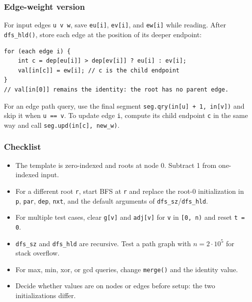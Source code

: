 \subsubsection{Edge-weight version}
For input edges \texttt{u v w}, save \texttt{eu[i]}, \texttt{ev[i]}, and \texttt{ew[i]} while reading. After \texttt{dfs\_hld()}, store each edge at the position of its deeper endpoint:

\begin{lstlisting}
for (each edge i) {
    int c = dep[eu[i]] > dep[ev[i]] ? eu[i] : ev[i];
    val[in[c]] = ew[i]; // c is the child endpoint
}
// val[in[0]] remains the identity: the root has no parent edge.
\end{lstlisting}

For an edge path query, use the final segment \texttt{seg.qry(in[u] + 1, in[v])} and skip it when \texttt{u == v}. To update edge \texttt{i}, compute its child endpoint \texttt{c} in the same way and call \texttt{seg.upd(in[c], new\_w)}.

\subsubsection{Checklist}
\begin{itemize}
\item The template is zero-indexed and roots at node 0. Subtract 1 from one-indexed input.
\item For a different root \texttt{r}, start BFS at \texttt{r} and replace the root-0 initialization in \texttt{p}, \texttt{par}, \texttt{dep}, \texttt{nxt}, and the default arguments of \texttt{dfs\_sz}/\texttt{dfs\_hld}.
\item For multiple test cases, clear \texttt{g[v]} and \texttt{adj[v]} for \texttt{v} in \texttt{[0, n)} and reset \texttt{t = 0}.
\item \texttt{dfs\_sz} and \texttt{dfs\_hld} are recursive. Test a path graph with $n = 2 \cdot 10^5$ for stack overflow.
\item For max, min, xor, or gcd queries, change \texttt{merge()} and the identity value.
\item Decide whether values are on nodes or edges before setup: the two initializations differ.
\end{itemize}
